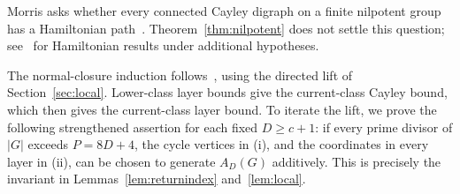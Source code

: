 \documentclass[11pt,a4paper,reqno]{amsart}
\theoremstyle{definition}
\theoremstyle{remark}
\numberwithin{equation}{section}
\begin{document}
Morris asks whether every connected Cayley digraph on a finite nilpotent group has a Hamiltonian path~\cite[Remarks 1.3(1)]{MorrisNoPath}. Theorem~\ref{thm:nilpotent} does not settle this question; see~\cite{WittePrimePower,Morris} for Hamiltonian results under additional hypotheses.

The normal-closure induction follows~\cite[Section 6]{LiMethuku}, using the directed lift of Section~\ref{sec:local}. Lower-class layer bounds give the current-class Cayley bound, which then gives the current-class layer bound. To iterate the lift, we prove the following strengthened assertion for each fixed $D\ge c+1$: if every prime divisor of $|G|$ exceeds $P=8D+4$, the cycle vertices in (i), and the coordinates in every layer in (ii), can be chosen to generate $A_D(G)$ additively. This is precisely the invariant in Lemmas~\ref{lem:returnindex} and~\ref{lem:local}.
\end{document}

